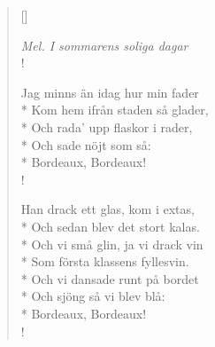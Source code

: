 
\settowidth{\versewidth}{Jag minns än idag hur min fader}



\begin{verse}[\versewidth]

\flagverse{}
\emph{Mel. I sommarens soliga dagar}\\!

Jag minns än idag hur min fader\\*
Kom hem ifrån staden så glader,\\*
Och rada' upp flaskor i rader,\\*
Och sade nöjt som så:\\*
Bordeaux, Bordeaux!\\!


Han drack ett glas, kom i extas,\\*
Och sedan blev det stort kalas.\\*
Och vi små glin, ja vi drack vin\\*
Som första klassens fyllesvin.\\*
Och vi dansade runt på bordet\\*
Och sjöng så vi blev blå:\\*
Bordeaux, Bordeaux!\\!


\end{verse}

